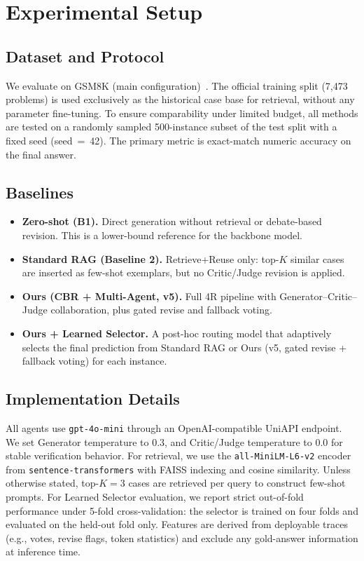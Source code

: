 \section{Experimental Setup}

\subsection{Dataset and Protocol}
We evaluate on GSM8K (main configuration)~\cite{cobbe2021gsm8k}. The official training split (7,473 problems) is used exclusively as the historical case base for retrieval, without any parameter fine-tuning. To ensure comparability under limited budget, all methods are tested on a randomly sampled 500-instance subset of the test split with a fixed seed (seed~=~42). The primary metric is exact-match numeric accuracy on the final answer.

\vspace{-0.25em}
\subsection{Baselines}
\begin{itemize}
  \setlength{\itemsep}{2pt}
  \setlength{\parskip}{0pt}
  \setlength{\parsep}{0pt}
  \item \textbf{Zero-shot (B1).} Direct generation without retrieval or debate-based revision. This is a lower-bound reference for the backbone model.
  \item \textbf{Standard RAG (Baseline 2).} Retrieve+Reuse only: top-$K$ similar cases are inserted as few-shot exemplars, but no Critic/Judge revision is applied.
  \item \textbf{Ours (CBR + Multi-Agent, v5).} Full 4R pipeline with Generator--Critic--Judge collaboration, plus gated revise and fallback voting.
  \item \textbf{Ours + Learned Selector.} A post-hoc routing model that adaptively selects the final prediction from Standard RAG or Ours (v5, gated revise + fallback voting) for each instance.
\end{itemize}

\vspace{-0.35em}
\subsection{Implementation Details}
All agents use \texttt{gpt-4o-mini} through an OpenAI-compatible UniAPI endpoint. We set Generator temperature to 0.3, and Critic/Judge temperature to 0.0 for stable verification behavior. For retrieval, we use the \texttt{all-MiniLM-L6-v2} encoder from \texttt{sentence-transformers} with FAISS indexing and cosine similarity. Unless otherwise stated, top-$K=3$ cases are retrieved per query to construct few-shot prompts.
For Learned Selector evaluation, we report strict out-of-fold performance under 5-fold cross-validation: the selector is trained on four folds and evaluated on the held-out fold only. Features are derived from deployable traces (e.g., votes, revise flags, token statistics) and exclude any gold-answer information at inference time.

